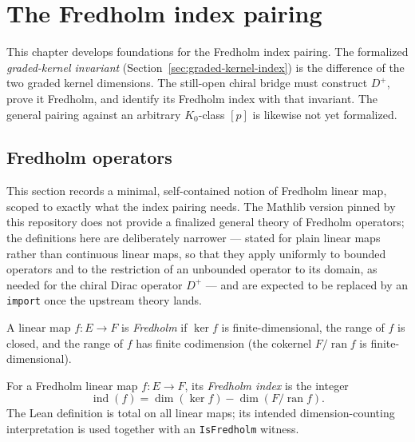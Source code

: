 \chapter{The Fredholm index pairing}
\label{cha:index-pairing}

This chapter develops foundations for the Fredholm index pairing.  The formalized
\emph{graded-kernel invariant} (Section~\ref{sec:graded-kernel-index}) is the difference of
the two graded kernel dimensions.  The still-open chiral bridge must construct $D^+$, prove it
Fredholm, and identify its Fredholm index with that invariant.  The general pairing against an
arbitrary $K_0$-class $[p]$ is likewise not yet formalized.

\section{Fredholm operators}
\label{sec:fredholm}

This section records a minimal, self-contained notion of Fredholm linear map, scoped to
exactly what the index pairing needs. The Mathlib version pinned by this repository does not
provide a finalized general theory of Fredholm operators; the definitions here are
deliberately narrower — stated for plain linear maps rather than continuous linear maps, so
that they apply uniformly to bounded operators and to the restriction of an unbounded
operator to its domain, as needed for the chiral Dirac operator $D^{+}$ — and are expected to
be replaced by an \texttt{import} once the upstream theory lands.

\begin{definition}
  \label{def:isFredholm}
  \leanok
  A linear map $f \colon E \to F$ is \emph{Fredholm} if $\ker f$ is finite-dimensional, the
  range of $f$ is closed, and the range of $f$ has finite codimension (the cokernel
  $F / \operatorname{ran} f$ is finite-dimensional).
\end{definition}

\begin{definition}
  \label{def:fredholm-index}
  \leanok
  For a Fredholm linear map $f \colon E \to F$, its \emph{Fredholm index} is the integer
  \[
    \operatorname{ind}(f) = \dim(\ker f) - \dim(F / \operatorname{ran} f).
  \]
  The Lean definition is total on all linear maps; its intended dimension-counting
  interpretation is used together with an \texttt{IsFredholm} witness.
\end{definition}


